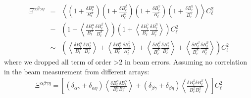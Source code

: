 \documentclass[a4paper, 11pt]{article}
\def\ba{\begin{eqnarray}}
\def\ea{\end{eqnarray}}
\begin{document}
\ba
\Xi^{ \alpha \beta \gamma \eta } &=& \left \langle \left(1 + \frac{\delta B^{\alpha}_{\ell}}{ B^{\alpha}_{\ell}} \right) \left(1 + \frac{\delta B^{\beta}_{\ell}}{ B^{\beta}_{\ell}} \right) \left(1 + \frac{\delta B^{\gamma}_{\ell}}{ B^{\gamma}_{\ell}} \right) \left(1 + \frac{\delta B^{\eta}_{\ell}}{ B^{\eta}_{\ell}} \right) \right \rangle C^{2}_{\ell} \nonumber \\
&-& \left(1 + \left \langle \frac{\delta B^{\alpha}_{\ell}}{ B^{\alpha}_{\ell}}  \frac{\delta B^{\beta}_{\ell}}{ B^{\beta}_{\ell}} \right \rangle \right) \left(1 + \left \langle \frac{\delta B^{\gamma}_{\ell}}{ B^{\gamma}_{\ell}}  \frac{\delta B^{\eta}_{\ell}}{ B^{\eta}_{\ell}} \right \rangle \right) C^{2}_{\ell} \nonumber \\
&\sim& \left( \left \langle \frac{\delta B^{\alpha}_{\ell}}{ B^{\alpha}_{\ell}}  \frac{\delta B^{\gamma}_{\ell}}{ B^{\gamma}_{\ell}} \right \rangle +  \left \langle \frac{\delta B^{\alpha}_{\ell}}{ B^{\alpha}_{\ell}}  \frac{\delta B^{\eta}_{\ell}}{ B^{\eta}_{\ell}} \right \rangle  + \left \langle \frac{\delta B^{\beta}_{\ell}}{ B^{\beta}_{\ell}}  \frac{\delta B^{\gamma}_{\ell}}{ B^{\gamma}_{\ell}} \right \rangle +  \left \langle \frac{\delta B^{\beta}_{\ell}}{ B^{\beta}_{\ell}}  \frac{\delta B^{\eta}_{\ell}}{ B^{\eta}_{\ell}} \right \rangle \right) C^{2}_{\ell} 
\ea
where we dropped all term of order >2 in beam errors.
Assuming no correlation in the beam measurement from different arrays:
    \ba
\Xi^{ \alpha \beta \gamma \eta } =   \left[  (\delta_{\alpha \gamma} + \delta_{\alpha \eta})  \left\langle  \frac{\delta B^{\alpha}_\ell \delta B^{\alpha}_\ell}{B^{\alpha}_{\ell}B^{\alpha}_{\ell}}   \right\rangle +  (\delta_{\beta \gamma} + \delta_{\beta \eta})  \left\langle  \frac{\delta B^{\beta}_\ell \delta B^{\beta}_\ell}{B^{\beta}_{\ell}B^{\beta}_{\ell}}  \right \rangle  \right] C^{2}_{\ell}  \nonumber \\ 
  \ea
\end{document}
